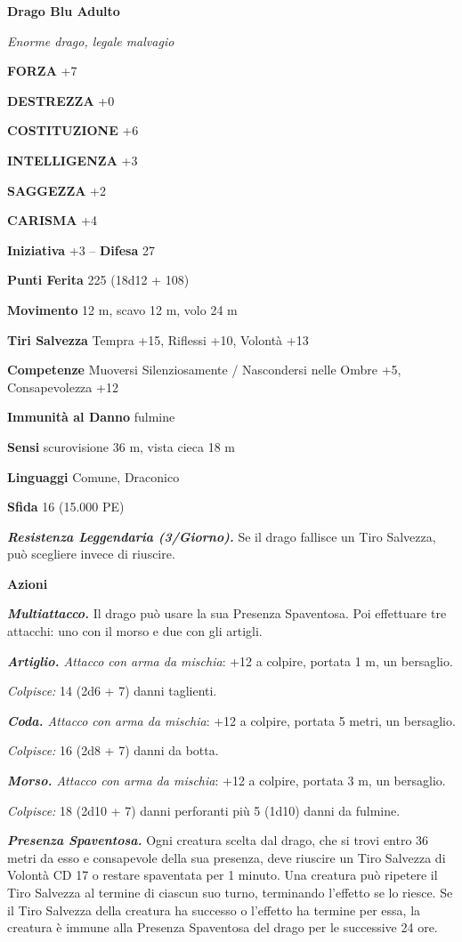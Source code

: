 \begin{multicols}{2}
\medskip{}\textbf{Drago Blu Adulto}

\emph{Enorme drago, legale malvagio}

\textbf{FORZA} +7

\textbf{DESTREZZA} +0

\textbf{COSTITUZIONE} +6

\textbf{INTELLIGENZA} +3

\textbf{SAGGEZZA} +2

\textbf{CARISMA} +4

\textbf{Iniziativa} +3 -- \textbf{Difesa} 27

\textbf{Punti Ferita} 225 (18d12 + 108)

\textbf{Movimento} 12 m, scavo 12 m, volo 24 m

\textbf{Tiri Salvezza} Tempra +15, Riflessi +10, Volontà +13

\textbf{Competenze} Muoversi Silenziosamente / Nascondersi nelle Ombre +5, Consapevolezza +12

\textbf{Immunità al Danno} fulmine

\textbf{Sensi} scurovisione 36 m, vista cieca 18 m

\textbf{Linguaggi} Comune, Draconico

\textbf{Sfida} 16 (15.000 PE)

\emph{\textbf{Resistenza Leggendaria (3/Giorno).}} Se il drago fallisce un Tiro Salvezza, può scegliere invece di riuscire.

\textbf{Azioni}

\emph{\textbf{Multiattacco.}} Il drago può usare la sua Presenza Spaventosa. Poi effettuare tre attacchi: uno con il morso e due con gli artigli.

\emph{\textbf{Artiglio.} Attacco con arma da mischia}: +12 a colpire, portata 1 m, un bersaglio.

\emph{Colpisce:} 14 (2d6 + 7) danni taglienti.

\emph{\textbf{Coda.} Attacco con arma da mischia}: +12 a colpire, portata 5 metri, un bersaglio.

\emph{Colpisce:} 16 (2d8 + 7) danni da botta.

\emph{\textbf{Morso.} Attacco con arma da mischia}: +12 a colpire, portata 3 m, un bersaglio.

\emph{Colpisce:} 18 (2d10 + 7) danni perforanti più 5 (1d10) danni da fulmine.

\emph{\textbf{Presenza Spaventosa.}} Ogni creatura scelta dal drago, che si trovi entro 36 metri da esso e consapevole della sua presenza, deve riuscire un Tiro Salvezza di Volontà CD 17 o restare spaventata per 1 minuto. Una creatura può ripetere il Tiro Salvezza al termine di ciascun suo turno, terminando l'effetto se lo riesce. Se il Tiro Salvezza della creatura ha successo o l'effetto ha termine per essa, la creatura è immune alla Presenza Spaventosa del drago per le successive 24 ore.


\end{multicols}
